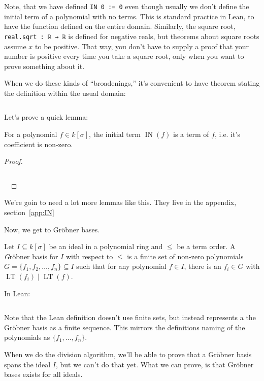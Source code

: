 \documentclass[a4paper, 12pt]{article}
\DeclareMathOperator{\IN}{IN}
\DeclareMathOperator{\LT}{LT}
\newcommand{\lean}[1]{\texttt{#1}}
\theoremstyle{changedot}
\theoremstyle{changedotbreak}
\theoremstyle{nonumberplain}
\newtheorem{proof}{Proof}
\begin{document}
Note, that we have defined \lean{IN 0 := 0} even though usually we don't define the initial term of a polynomial with no terms. This is standard practice in Lean, to have the function defined on the entire domain. Similarly, the square root, \lean{real.sqrt : ℝ → ℝ} is defined for negative reals, but theorems about square roots assume $x$ to be positive. That way, you don't have to supply a proof that your number is positive every time you take a square root, only when you want to prove something about it.

When we do these kinds of ``broadenings,'' it's convenient to have theorem stating the definition within the usual domain:

\inputminted[firstline=45, lastline=49]{lean}{../src/initial_term.lean}

Let's prove a quick lemma:

\begin{lemma}
  For a polynomial $f \in k[\sigma]$, the initial term $\IN(f)$ is a term of $f$, i.e. it's coefficient is non-zero.
\end{lemma}
\begin{proof}
  ~
  \inputminted[firstline=50, lastline=54]{lean}{../src/initial_term.lean}
  ~
\end{proof}

We're goin to need a lot more lemmas like this. They live in the appendix, section~\ref{app:IN}

Now, we get to Gröbner bases.

\begin{definition}
  Let $I \subseteq k[\sigma]$ be an ideal in a polynomial ring and $\le$ be a term order. A {\emph Gröbner basis} for $I$ with respect to $\le$ is a finite set of non-zero polynomials $G = \{f_{1}, f_{2}, \dots, f_{n}\} \subseteq I$ such that for any polynomial $f \in I$, there is an $f_{i} \in G$ with $\LT(f_{i}) \mid \LT(f)$.

  In Lean:
  \inputminted[firstline=21, lastline=23]{lean}{../src/groebner_basis.lean}
\end{definition}

Note that the Lean definition doesn't use finite sets, but instead represents a the Gröbner basis as a finite sequence. This mirrors the definitions naming of the polynomials as $\{f_{1}, \dots, f_{n}\}$.

When we do the division algorithm, we'll be able to prove that a Gröbner basis spans the ideal $I$, but we can't do that yet. What we can prove, is that Gröbner bases exists for all ideals.
\end{document}
